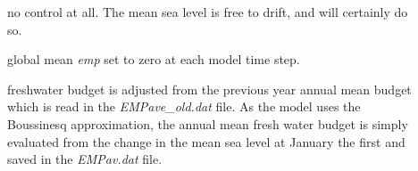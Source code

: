 \documentclass[../main/NEMO_manual]{subfiles}
\begin{document}
\begin{description}
\item [{}] no control at all.
  The mean sea level is free to drift, and will certainly do so.
\item [{}] global mean \textit{emp} set to zero at each model time step.
\item [{}] freshwater budget is adjusted from the previous year annual mean budget which
  is read in the \textit{EMPave\_old.dat} file.
  As the model uses the Boussinesq approximation, the annual mean fresh water budget is simply evaluated from
  the change in the mean sea level at January the first and saved in the \textit{EMPav.dat} file.
\end{description}


\subinc{}
\end{document}
